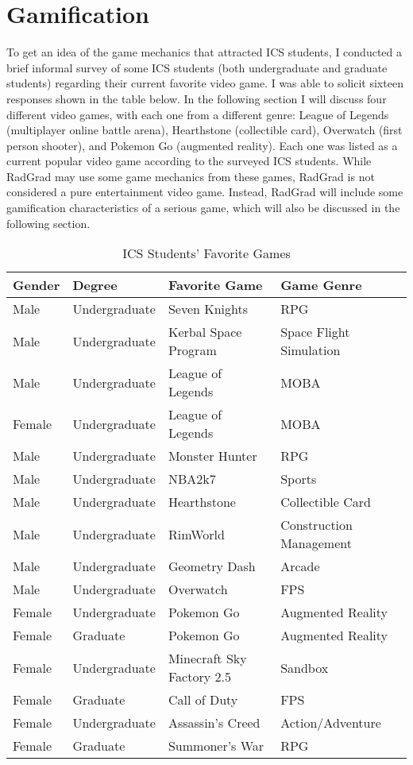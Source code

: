 \section{Gamification}

To get an idea of the game mechanics that attracted ICS students, I conducted a brief informal survey of some ICS students (both undergraduate and graduate students) regarding their current favorite video game. I was able to solicit sixteen responses shown in the table below. In the following section I will discuss four different video games, with each one from a different genre:  League of Legends (multiplayer online battle arena), Hearthstone (collectible card), Overwatch (first person shooter), and Pokemon Go (augmented reality). Each one was listed as a current popular video game according to the surveyed ICS students. While RadGrad may use some game mechanics from these games, RadGrad is not considered a pure entertainment video game. Instead, RadGrad will include some gamification characteristics of a serious game, which will also be discussed in the following section. 
\\
\begin{table}[htbp!]
\centering
\caption{ICS Students' Favorite Games}
\begin{tabular}{ |p{2cm}|p{3cm}|p{5cm}|p{5cm}|}
 \hline
 Gender & Degree & Favorite Game & Game Genre\\
 \hline
 Male   & Undergraduate    & Seven Knights & RPG\\
 Male   & Undergraduate    & Kerbal Space Program & Space Flight Simulation\\
 Male   & Undergraduate    & League of Legends & MOBA\\
 Female   & Undergraduate    & League of Legends & MOBA\\
 Male   & Undergraduate    & Monster Hunter & RPG\\
 Male   & Undergraduate    & NBA2k7 & Sports\\
 Male   & Undergraduate    & Hearthstone & Collectible Card\\
 Male   & Undergraduate    & RimWorld & Construction Management\\
 Male   & Undergraduate    & Geometry Dash & Arcade\\
 Male   & Undergraduate    & Overwatch & FPS\\
 Female   & Undergraduate    & Pokemon Go & Augmented Reality\\
 Female   & Graduate    & Pokemon Go & Augmented Reality\\
 Female   & Undergraduate    & Minecraft Sky Factory 2.5 & Sandbox\\
 Female   & Graduate    & Call of Duty & FPS\\
 Female   & Undergraduate    & Assassin's Creed & Action/Adventure\\
 Female   & Graduate    & Summoner's War & RPG\\
 \hline
\end{tabular}
\end{table}

